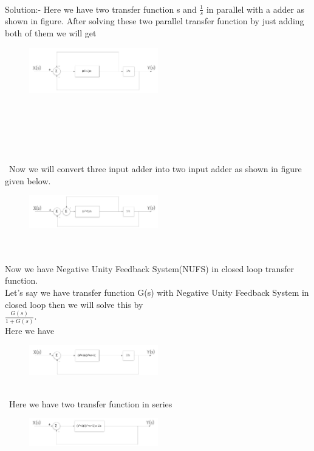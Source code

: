\documentclass[journal,12pt,twocolumn]{IEEEtran}
\begin{document}
\\
\begin{frame}{Solution:- }
Here we have two transfer function s and $\frac{1}{s}$ in parallel with a adder as shown in figure.
After solving these two parallel transfer function by just adding both of them we will get
\begin{figure}[h]
\includegraphics[width=0.5\textwidth]{./figs/pic2.png}
\end{figure}
\\\\\\\\\\\
Now we will convert three input adder into two input adder as shown in figure given below.
\begin{figure}[h]
\includegraphics[width=0.5\textwidth]{./figs/pic3.png}
\end{figure}
\\\\
Now we have Negative Unity Feedback System(NUFS) in closed loop transfer function. \\Let's say we have transfer function G(s) with Negative Unity Feedback System in closed loop then we will solve this by\\              $\frac{G(s)}{1+G(s)}$.
\\Here we have
\begin{figure}[h]
\includegraphics[width=0.5\textwidth]{./figs/pic4.png}
\end{figure}
\\\
Here we have two transfer function in series 
\begin{figure}[h]
\includegraphics[width=0.5\textwidth]{./figs/pic5.png}

\end{figure}
\end{frame}
\end{document}
